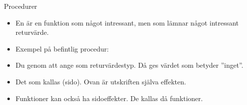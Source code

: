 %
%

\begin{Slide}{Procedurer}\SlideFontSmall
\begin{itemize}
\item En  är en funktion som  något intressant, men som  lämnar något intressant returvärde.
\item Exempel på befintlig procedur: 
\item Du  genom att ange \texttt{} som returvärdestyp. Då ges värdet \texttt{\Alert{()}} som betyder ''inget''.
\end{itemize}
\begin{itemize}
\item Det som  kallas (sido). Ovan är utskriften själva effekten.
\item Funktioner kan också ha sidoeffekter. De kallas då  funktioner.
\end{itemize}
\end{Slide}

